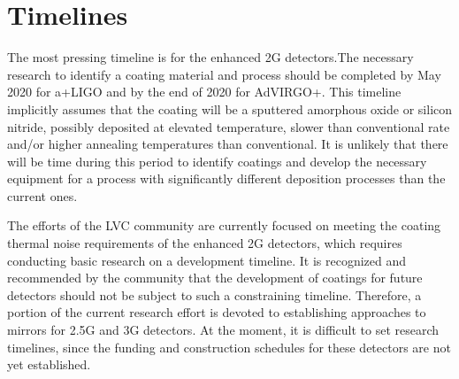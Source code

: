 \section{Timelines}

The most pressing timeline is for the enhanced 2G detectors.The necessary research to identify a coating material and process should be completed by May 2020 for a+LIGO and by the end of 2020 for AdVIRGO+. This timeline implicitly assumes that the coating will be a sputtered amorphous oxide or silicon nitride, possibly deposited at elevated temperature, slower than conventional rate and/or higher annealing temperatures than conventional. It is unlikely that there will be time during this period to identify coatings and develop the necessary equipment for a process with significantly different deposition processes than the current ones.


The efforts of the LVC community are currently focused on meeting the coating thermal noise requirements of the enhanced 2G detectors, which requires conducting basic research on a development timeline. It is recognized and recommended by the community that the development of coatings for future detectors should not be subject to such a constraining timeline. Therefore, a portion of the current research effort is devoted to establishing approaches to mirrors for 2.5G and 3G detectors. At the moment, it is difficult to set research timelines, since the funding and construction schedules for these detectors are not yet established.

